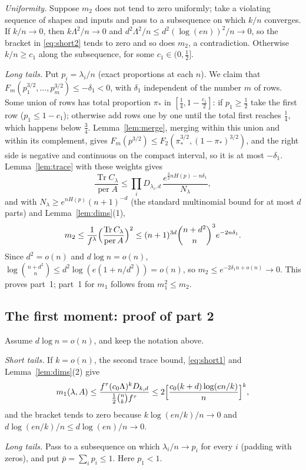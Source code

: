 \documentclass[11pt,a4paper]{article}
\theoremstyle{remark}
\newcommand{\per}{\operatorname{per}}
\newcommand{\Tr}{\operatorname{Tr}}
\begin{document}
\emph{Uniformity.} Suppose $m_2$ does not tend to zero uniformly; take a violating sequence of shapes and inputs and pass to a subsequence on which $k/n$ converges. If $k/n\to0$, then $k\Lambda^2/n\to0$ and $d^2\Lambda^2/n\le d^2(\log(en))^2/n\to0$, so the bracket in \eqref{eq:short2} tends to zero and so does $m_2$, a contradiction. Otherwise $k/n\ge c_1$ along the subsequence, for some $c_1\in(0,\frac12]$.

\emph{Long tails.} Put $p_i=\lambda_i/n$ (exact proportions at each $n$). We claim that $F_m(p_1^{3/2},\dots,p_m^{3/2})\le-\delta_1<0$, with $\delta_1$ independent of the number $m$ of rows. Some union of rows has total proportion $\pi_*$ in $[\frac14,1-\frac{c_1}2]$: if $p_1\ge\frac12$ take the first row ($p_1\le1-c_1$); otherwise add rows one by one until the total first reaches $\frac14$, which happens below $\frac34$. Lemma~\ref{lem:merge}, merging within this union and within its complement, gives $F_m(p^{3/2})\le F_2(\pi_*^{3/2},(1-\pi_*)^{3/2})$, and the right side is negative and continuous on the compact interval, so it is at most $-\delta_1$. Lemma~\ref{lem:trace} with these weights gives
\[
 \frac{\Tr C_\lambda}{\per A}\le\prod_iD_{\lambda_i,d}\,\frac{e^{\frac32nH(p)-n\delta_1}}{N_\lambda},
\]
and with $N_\lambda\ge e^{nH(p)}(n+1)^{-d}$ (the standard multinomial bound for at most $d$ parts) and Lemma~\ref{lem:dims}(1),
\[
 m_2\le\frac1{f^\lambda}\Bigl(\frac{\Tr C_\lambda}{\per A}\Bigr)^2\le(n+1)^{3d}\binom{n+d^2}{n}^3e^{-2n\delta_1}.
\]
Since $d^2=o(n)$ and $d\log n=o(n)$, $\log\binom{n+d^2}{n}\le d^2\log(e(1+n/d^2))=o(n)$, so $m_2\le e^{-2\delta_1n+o(n)}\to0$. This proves part~1; part~1 for $m_1$ follows from $m_1^2\le m_2$.

\subsection{The first moment: proof of part 2}
Assume $d\log n=o(n)$, and keep the notation above.

\emph{Short tails.} If $k=o(n)$, the second trace bound, \eqref{eq:short1} and Lemma~\ref{lem:dims}(2) give
\[
 m_1(\lambda,A)\le\frac{f^\tau(c_0\Lambda)^kD_{k,d}}{\frac12\binom nkf^\tau}\le2\Bigl[\frac{c_0(k+d)\log(en/k)}{n}\Bigr]^k,
\]
and the bracket tends to zero because $k\log(en/k)/n\to0$ and $d\log(en/k)/n\le d\log(en)/n\to0$.

\emph{Long tails.} Pass to a subsequence on which $\lambda_i/n\to p_i$ for every $i$ (padding with zeros), and put $\bar p=\sum_ip_i\le1$. Here $p_1<1$.
\end{document}
